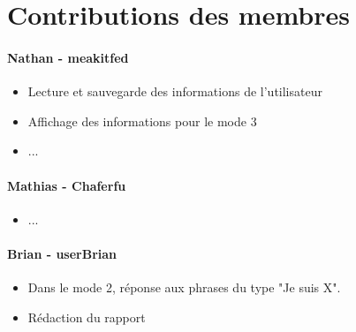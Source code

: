 \documentclass[paper=a4, fontsize=11pt]{article}
\begin{document}
\vspace{0.5cm}

\section{Contributions des membres}

\paragraph{Nathan - meakitfed}
\begin{itemize}
\item Lecture et sauvegarde des informations de l'utilisateur
\item Affichage des informations pour le mode 3
\item ...
\end{itemize}

\paragraph{Mathias - Chaferfu} 
\begin{itemize}
\item ...
\end{itemize}

\paragraph{Brian - userBrian} 
\begin{itemize}
\item Dans le mode 2, réponse aux phrases du type "Je suis X".
\item Rédaction du rapport
\end{itemize}
\end{document}

